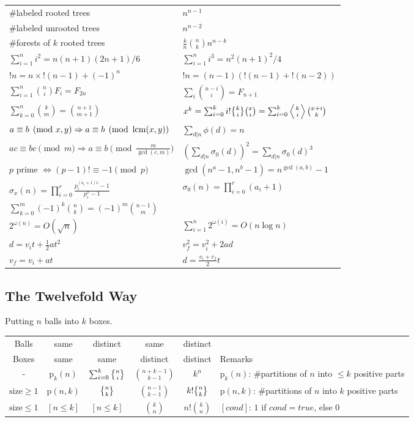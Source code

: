   \vspace{10pt}
  \begin{tabular}{ll}
    \#labeled rooted trees & $n^{n-1}$ \\
    \#labeled unrooted trees & $n^{n-2}$ \\
    \#forests of $k$ rooted trees & $\frac{k}{n}\binom{n}{k}n^{n-k}$ \\
    $\sum_{i=1}^n i^2 = n(n+1)(2n+1)/6$ & $\sum_{i=1}^n i^3 = n^2(n+1)^2/4$ \\
    $!n = n\times!(n-1)+(-1)^n$ & $!n = (n-1)(!(n-1)+!(n-2))$ \\
    $\sum_{i=1}^n \binom{n}{i} F_i = F_{2n}$ & $\sum_{i} \binom{n-i}{i} = F_{n+1}$ \\
    $\sum_{k=0}^n \binom{k}{m} = \binom{n+1}{m+1}$ & $x^k = \sum_{i=0}^k i!\stirling{k}{i}\binom{x}{i} = \sum_{i=0}^k \left\langle {k \atop i} \right\rangle\binom{x+i}{k}$ \\

    $a\equiv b\pmod{x,y} \Rightarrow a\equiv b\pmod{\operatorname{lcm}(x,y)}$ & $\sum_{d|n} \phi(d) = n$ \\
    $ac\equiv bc\pmod{m} \Rightarrow a\equiv b\pmod{\frac{m}{\gcd(c,m)}}$ & $(\sum_{d|n} \sigma_0(d))^2 = \sum_{d|n} \sigma_0(d)^3$ \\
    $p$ prime $\Leftrightarrow (p-1)!\equiv -1\pmod{p}$ & $\gcd(n^a-1,n^b-1) = n^{\gcd(a,b)}-1$ \\
    $\sigma_x(n) = \prod_{i=0}^{r} \frac{p_i^{(a_i + 1)x} - 1}{p_i^x - 1}$ & $\sigma_0(n) = \prod_{i=0}^r (a_i + 1)$ \\
    $\sum_{k=0}^m (-1)^k \binom{n}{k} = (-1)^m \binom{n-1}{m}$ & \\
    $2^{\omega(n)} = O(\sqrt{n})$ & $\sum_{i=1}^n 2^{\omega(i)} = O(n \log n)$ \\
    $d = v_i t + \frac{1}{2}at^2$ & $v_f^2 = v_i^2 + 2ad$ \\
    $v_f = v_i + at$ & $d = \frac{v_i + v_f}{2}t$ \\
  \end{tabular}
  \subsection{The Twelvefold Way}
    Putting $n$ balls into $k$ boxes.\\
  \begin{tabular}{@{}c|c|c|c|c|l@{}}
  Balls & same & distinct & same & distinct & \\
  Boxes & same & same & distinct & distinct & Remarks\\
  \hline
    - & $\mathrm{p}_k(n)$ & $\sum_{i=0}^k \stirling{n}{i}$ & $\binom{n+k-1}{k-1}$ & $k^n$ & $\mathrm{p}_k(n)$: \#partitions of $n$ into $\le k$ positive parts \\
    $\mathrm{size}\ge 1$ & $\mathrm{p}(n,k)$ & $\stirling{n}{k}$ & $\binom{n-1}{k-1}$ & $k!\stirling{n}{k}$ & $\mathrm{p}(n,k)$: \#partitions of $n$ into $k$ positive parts \\
    $\mathrm{size}\le 1$ & $[n \le k]$ & $[n \le k]$ & $\binom{k}{n}$ & $n!\binom{k}{n}$ & $[cond]$: $1$ if $cond=true$, else $0$\\
  \bottomrule
  \end{tabular}

\clearpage
